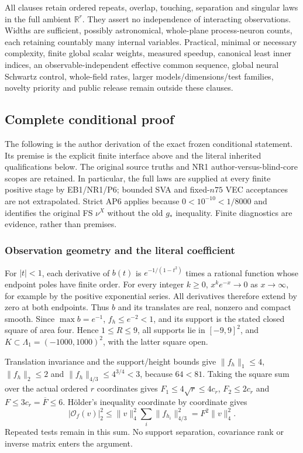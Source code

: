 \documentclass[11pt]{article}
\theoremstyle{plain}
\theoremstyle{definition}
\theoremstyle{remark}
\newcommand{\R}{\mathbb{R}}
\begin{document}
All clauses retain ordered repeats, overlap, touching, separation and singular
laws in the full ambient $\R^r$. They assert no independence of interacting
observations. Widths are sufficient, possibly astronomical, whole-plane
process-neuron counts, each retaining countably many internal variables.
Practical, minimal or necessary complexity, finite global scalar weights,
measured speedup, canonical least inner indices, an observable-independent
effective common sequence, global neural Schwartz control, whole-field rates,
larger models/dimensions/test families, novelty priority and public release
remain outside these clauses.

\subsection{Complete conditional proof}
\label{uda:proof}
The following is the author derivation of the exact frozen conditional
statement. Its premise is the explicit finite interface above and the literal
inherited qualifications below. The original source truths and NR1
author-versus-blind-core scopes are retained. In particular, the full laws
are supplied at every finite positive stage by EB1/NR1/P6; bounded SVA and
fixed-$n75$ VEC acceptances are not extrapolated. Strict AP6 applies because
$0<10^{-10}<1/8000$ and identifies the original FS $\nu^X$ without the old
$g_*$ inequality. Finite diagnostics are evidence, rather than premises.

\subsubsection{Observation geometry and the literal coefficient}
For $|t|<1$, each derivative of $b(t)$ is $e^{-1/(1-t^2)}$ times a rational
function whose endpoint poles have finite order. For every integer $k\ge0$,
$x^ke^{-x}\to0$ as $x\to\infty$, for example by the positive exponential
series. All derivatives therefore extend by zero at both endpoints.
Thus $b$ and its translates are real, nonzero and compact smooth. Since
$\max b=e^{-1}$, $f_h\le e^{-2}<1$, and its support is the stated closed
square of area four. Hence $1\le R\le9$, all supports lie in $[-9,9]^2$,
and $K\subset\Lambda_1=(-1000,1000)^2$, with the latter square open.

Translation invariance and the support/height bounds give
$\|f_h\|_1\le4$, $\|f_h\|_2\le2$ and
$\|f_h\|_{4/3}\le4^{3/4}<3$, because $64<81$.
Taking the square sum over the actual ordered $r$ coordinates gives
$F_1\le4\sqrt r\le4c_r$, $F_2\le2c_r$ and
$F\le3c_r=\overline F\le6$. H\"older's inequality coordinate by coordinate gives
\begin{equation}
 |\mathcal O_f(v)|_2^2\le\|v\|_4^2\sum_i\|f_{h_i}\|_{4/3}^2
 =F^2\|v\|_4^2.\tag{1.1}
\end{equation}
Repeated tests remain in this sum. No support separation, covariance rank
or inverse matrix enters the argument.
\end{document}
